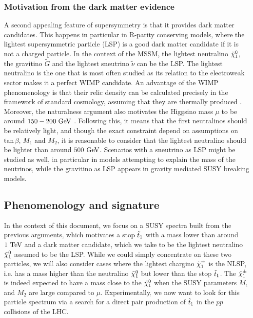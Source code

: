     \subsubsection{Motivation from the dark matter evidence}

    A second appealing feature of supersymmetry is that it provides dark matter
    candidates. This happens in particular in R-parity conserving models, where the
    lightest supersymmetric particle (LSP) is a good dark matter candidate if it is
    not a charged particle. In the context of the MSSM, the lightest neutralino
    $\tilde{\chi}_1^0$, the gravitino $\tilde{G}$ and the lightest sneutrino $\tilde{\nu}$
    can be the LSP. The lightest neutralino is the one that is most often studied as its
    relation to the electroweak sector makes it a perfect WIMP candidate.
    An advantage of the WIMP phenomenology is that their relic density can be calculated
    precisely in the framework of standard cosmology, assuming that they are thermally produced
    \cite{EllisDarkMatter}.
    Moreover, the naturalness argument also motivates the Higgsino mass $\mu$ to be around
    $150-200~\text{GeV}$ \cite{NaturalSUSYAndDarkMatter}. Following this, it means that the first
    neutralinos should be relatively light, and though the exact constraint
    depend on assumptions on $\text{tan}\, \beta$, $M_1$ and $M_2$, it is reasonable to
    consider that the lightest neutralino should be lighter than around $500~\text{GeV}$.
    Scenarios with a sneutrino as LSP might be studied as well, in particular in models
    attempting to explain the mass of the neutrinos, while the gravitino as LSP appears
    in gravity mediated SUSY breaking models.

    \subsection{Phenomenology and signature \label{sec:phenoAndSignature}}

    In the context of this document, we focus on a SUSY spectra built from the
    previous arguments, which motivates a stop $\tilde{t}_1$ with a mass lower than around
    $1~\text{TeV}$ and a dark matter candidate, which we take to be the lightest neutralino
    $\tilde{\chi}_1^0$ assumed to be the LSP. While we could simply concentrate on these
    two particles, we will also consider cases where the lightest chargino $\tilde{\chi}_1^\pm$
    is the NLSP, i.e. has a mass higher than the neutralino $\tilde{\chi}_1^0$ but lower
    than the stop $\tilde{t}_1$. The $\tilde{\chi}_1^\pm$ is indeed expected to have a mass close
    to the $\tilde{\chi}_1^0$ when the SUSY parameters $M_1$ and $M_2$
    are large compared to $\mu$. Experimentally, we now want to look for this particle
    spectrum via a search for a direct pair production of $\tilde{t}_1$ in the $pp$ collisions of the LHC.

